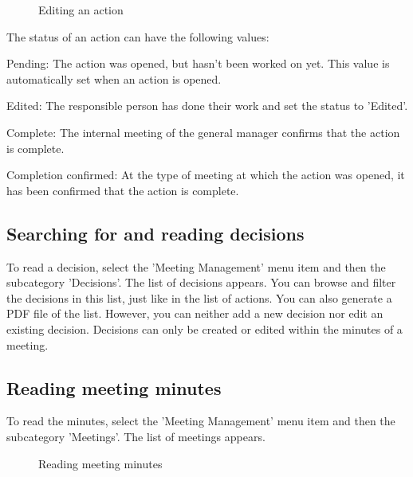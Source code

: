 \begin{figure}[H]
\caption{Editing an action}
\end{figure}

The status of an action can have the following values:

\begin{compactitem}
\item
Pending: The action was opened, but hasn't been worked on yet. This value is automatically set when an action is opened.
\item
Edited: The responsible person has done their work and set the status to 'Edited'.
\item
Complete: The internal meeting of the general manager confirms that the action is complete.
\item
Completion confirmed: At the type of meeting at which the action was opened, 
it has been confirmed that the action is complete.
\end{compactitem}

\subsection{Searching for and reading decisions}

To read a decision, select the 'Meeting Management' menu item and then the subcategory 'Decisions'. The list of decisions appears. You can browse and filter the decisions in this list, just like in the list of actions. You can also generate a PDF file of the list. However, you can neither add a new decision nor edit an existing decision. Decisions can only be created or edited within the minutes of a meeting.

\subsection{Reading meeting minutes}

To read the minutes, select the 'Meeting Management' menu item and then the subcategory 'Meetings'. The list of meetings appears.

\begin{figure}[H]
\caption{Reading meeting minutes}
\end{figure}

